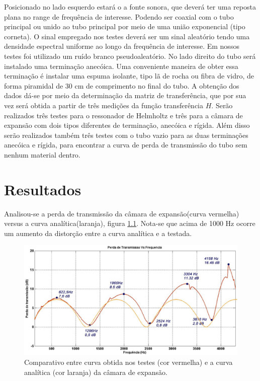 Posicionado no lado esquerdo estará o a fonte sonora, que deverá ter uma reposta plana no range de frequência de interesse. Podendo ser coaxial com o tubo principal ou unido ao tubo principal por meio de uma união exponencial (tipo corneta). O sinal empregado nos testes deverá ser um sinal aleatório tendo uma densidade espectral uniforme ao longo da frequência de interesse. Em nossos testes foi utilizado um ruído branco pseudoaleatório.
No lado direito do tubo será instalado uma terminação anecóica. Uma conveniente maneira de obter essa terminação é instalar uma espuma isolante, tipo lã de rocha ou fibra de vidro, de forma piramidal de 30 cm de comprimento no final do tubo.
 A obtenção dos dados dá-se por meio da determinação da matriz de transferência, que por sua vez será obtida a partir de três medições da função transferência $H$. Serão realizados três testes para o ressonador de Helmholtz e três para a câmara de expansão com dois tipos diferentes de terminação, anecóica e rígida. Além disso serão realizados também três testes com o tubo vazio para as duas terminações anecóica e rígida, para encontrar a curva de perda de transmissão do tubo sem nenhum material dentro.

\chapter{Resultados}\label{resultados}

Analisou-se a perda de transmissão da câmara de expansão(curva vermelha) versus a curva analítica(laranja), figura \ref{resultado_1}. Nota-se que acima de 1000 Hz ocorre um aumento da distorção entre a curva analítica e a testada.

\begin{figure}[h]
\centering
\includegraphics[scale=0.52]{resultados_1.eps}
\caption{Comparativo entre curva obtida nos testes (cor vermelha) e a curva analítica (cor laranja) da câmara de expansão.}
\label{resultado_1}
\end{figure}


